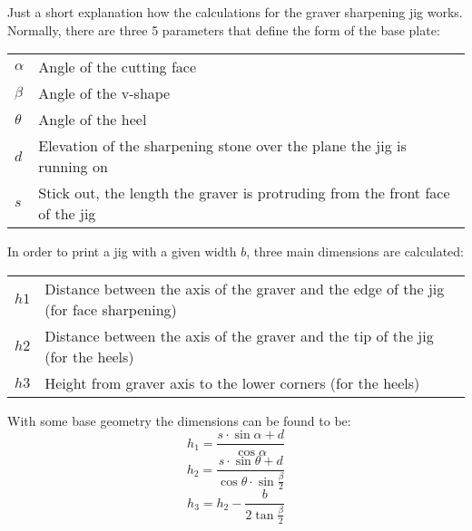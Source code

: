 \documentclass[a4paper,10pt]{report}
\begin{document}
Just a short explanation how the calculations for the graver sharpening jig works. 
Normally, there are three 5 parameters that define the form of the base plate:


\begin{tabular}{ll}
 $\alpha$ & Angle of the cutting face \\
 $\beta$ & Angle of the v-shape \\
 $\theta$ & Angle of the heel \\
 $d$ & Elevation of the sharpening stone over the plane the jig is running on \\
 $s$ & Stick out, the length the graver is protruding from the front face of the jig
\end{tabular} 


\vspace{2em}
In order to print a jig with a given width $b$, three main dimensions are calculated:
\vspace{1em}

\begin{minipage}{0.45\textwidth}
\end{minipage}
\begin{minipage}{0.45\textwidth}
 \begin{tabular}{lp{5cm}}
  $h1$ & Distance between the axis of the graver and the edge of the jig (for face sharpening) \\
  $h2$ & Distance between the axis of the graver and the tip of the jig (for the heels) \\
  $h3$ & Height from graver axis to the lower corners (for the heels) \\
 \end{tabular}
\end{minipage}

With some base geometry the dimensions can be found to be:
$$
    h_1 = \frac{s \cdot \sin \alpha  + d}{\cos \alpha}
$$
$$
    h_2 = \frac{s \cdot \sin \theta  + d}{\cos \theta \cdot \sin \frac{\beta}{2}}
$$
$$
    h_3 = h_2 - \frac{b}{2 \tan \frac{\beta}{2}}
$$
\end{document}
